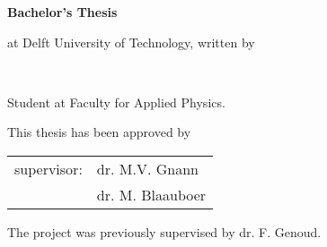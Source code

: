 \begin{titlepage}

\begin{center}


\vspace*{2\bigskipamount}

{\makeatletter
\titlestyle\bfseries\LARGE\@title
\makeatother}

{\makeatletter
\ifx\@subtitle\undefined\else
    \bigskip
    \titlefont\titleshape\Large\@subtitle
\fi
\makeatother}

\vfill

{\Large\titlefont\bfseries Bachelor's Thesis}

\bigskip
\bigskip

at Delft University of Technology, written by

\bigskip
\bigskip


\makeatletter
{\Large\titlefont\bfseries\@firstname\ {\titleshape\@lastname}}
\makeatother

\bigskip

Student at Faculty for Applied Physics.\\

\vspace*{2\bigskipamount}

\end{center}

\clearpage
\thispagestyle{empty}

\noindent This thesis has been approved by

\medskip\noindent
\begin{tabular}{p{2cm}l}
supervisor: &dr. M.V. Gnann\\
&dr. M. Blaauboer
\end{tabular}

\medskip
\noindent The project was previously supervised by dr. F. Genoud.

\bigskip
\bigskip


\end{titlepage}
